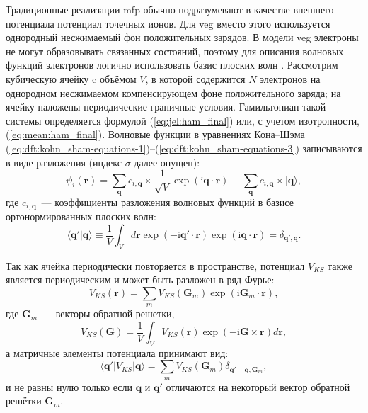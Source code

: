 Традиционные реализации \acrshort{mfp} обычно подразумевают в качестве внешнего потенциала потенциал точечных ионов. Для \acrshort{veg} вместо этого используется однородный несжимаемый фон положительных зарядов. В модели \acrshort{veg} электроны не могут образовывать связанных состояний, поэтому для описания волновых функций электронов логично использовать базис плоских волн \cite{Martin:book:2004}. Рассмотрим кубическую ячейку c объёмом $V$, в которой содержится $N$ электронов на однородном несжимаемом компенсирующем фоне положительного заряда; на ячейку наложены периодические граничные условия. Гамильтониан такой системы определяется формулой (\ref{eq:jel:ham_final}) или, с учетом изотропности, (\ref{eq:mean:ham_final}). Волновые функции в уравнениях Кона--Шэма  (\ref{eq:dft:kohn_sham-equations-1})--(\ref{eq:dft:kohn_sham-equations-3}) записываются в виде разложения (индекс $\sigma$ далее опущен):
%
\begin{equation}
    \psi_i(\mathbf{r}) = \sum_\mathbf{q} c_{i,\mathbf{q}}\times
        \frac{1}{\sqrt{V}} \exp(\text{i} \mathbf{q}\cdot\mathbf{r})\equiv
        \sum_\mathbf{q} c_{i,\mathbf{q}}\times |\mathbf{q}\rangle,
\end{equation}
%
где $c_{i,\mathbf{q}}$~--- коэффициенты разложения волновых функций в базисе ортонормированных плоских волн:
%
\begin{equation}
    \langle\mathbf{q}'|\mathbf{q}\rangle\equiv
        \frac{1}{V}\int_V d\mathbf{r} \exp(-\text{i}\mathbf{q}'\cdot\mathbf{r}) 
        \exp(\text{i}\mathbf{q}\cdot \mathbf{r}) = \delta_{\mathbf{q}',\mathbf{q}}.
\end{equation}
%

Так как ячейка периодически повторяется в пространстве, потенциал $V_{KS}$ также является периодическим и может быть разложен в ряд Фурье:
%
\begin{equation}
    V_{KS}(\mathbf{r}) = \sum_m V_{KS}(\mathbf{G}_m)\exp(\text{i}\mathbf{G}_m\cdot\mathbf{r}),
\end{equation}
%
где $\mathbf{G}_m$~--- векторы обратной решетки, 
%
\begin{equation}
    V_{KS}(\mathbf{G}) = \frac{1}{V} \int_V V_{KS}(\mathbf{r})\exp(-\text{i}\mathbf{G}\times \mathbf{r})d\mathbf{r},
\end{equation}
%
а матричные элементы потенциала принимают вид:
%
\begin{equation}
    \langle\mathbf{q}'|V_{KS}|\mathbf{q}\rangle = \sum_m V_{KS}(\mathbf{G}_m)
        \delta_{\mathbf{q}' - \mathbf{q},\mathbf{G}_m},
\end{equation}
%
и не равны нулю только если $\mathbf{q}$ и $\mathbf{q'}$ отличаются на некоторый вектор обратной решётки $\mathbf{G}_m$.

